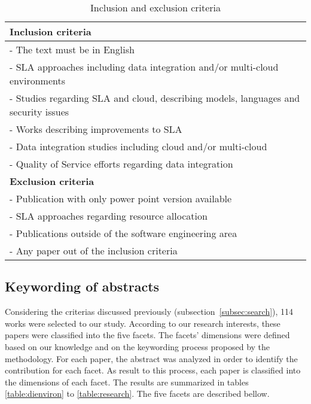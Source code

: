 \begin{table}[!htb]
\begin{center}
\begin{tabular}{p{10cm}}
\bottomrule \hline
\textbf{Inclusion criteria} \\ 
\hline 
- The text must be in English \\ 
- SLA approaches including data integration and/or multi-cloud environments\\
- Studies regarding SLA and cloud, describing models, languages and security issues \\
- Works describing improvements to SLA \\
- Data integration studies including cloud and/or multi-cloud  \\
- Quality of Service efforts regarding data integration \\
\bottomrule \hline 
\textbf{Exclusion criteria} \\ 
\hline 
- Publication with only power point version available \\ 
- SLA approaches regarding resource allocation \\
- Publications outside of the software engineering area \\
- Any paper out of the inclusion criteria  \\
\bottomrule \hline
\end{tabular} 
\end{center}
\caption{Inclusion and exclusion criteria}\label{table:criteria}
\end{table}

\subsection{Keywording of abstracts}

Considering the criterias discussed previously (subsection~\ref{subsec:search}),
114 works were selected to our study. 
According to our research interests, these papers were classified into the five facets. 
The facets' dimensions were defined based on our knowledge and on the keywording process proposed by the
methodology.   
For each paper, the abstract
was analyzed in order to identify the contribution for each facet.
As result to this process, each paper is classified into the dimensions of each facet. 
The results are summarized in tables \ref{table:dienviron} to \ref{table:research}. 
The five facets are described bellow.

